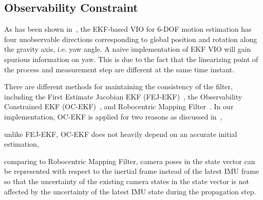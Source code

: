 \subsection{Observability Constraint}
\label{subsec: observability constraint}
As has been shown in~\cite{huang2010observability, li2013high}, the EKF-based VIO for 6-DOF motion estimation has four unobservable directions corresponding to global position and rotation along the gravity axis, i.e. yaw angle. A naive implementation of EKF VIO will gain spurious information on yaw. This is due to the fact that the linearizing point of the process and measurement step are different at the same time instant.

There are different methods for maintaining the consistency of the filter, including the First Estimate Jacobian EKF (FEJ-EKF)~\cite{huang2010observability}, the Observability Constrained EKF (OC-EKF)~\cite{hesch2012observability}, and Robocentric Mapping Filter~\cite{castellanos2007robocentric}. In our implementation, OC-EKF is applied for two reasons as discussed in~\cite{huang2010observability},
\begin{enumerate*}[label=(\roman*)]
\item unlike FEJ-EKF, OC-EKF does not heavily depend on an accurate initial estimation,
\item comparing to Robocentric Mapping Filter, camera poses in the state vector can be represented with respect to the inertial frame instead of the latest IMU frame so that the uncertainty of the existing camera states in the state vector is not affected by the uncertainty of the latest IMU state during the propagation step.
\end{enumerate*}
